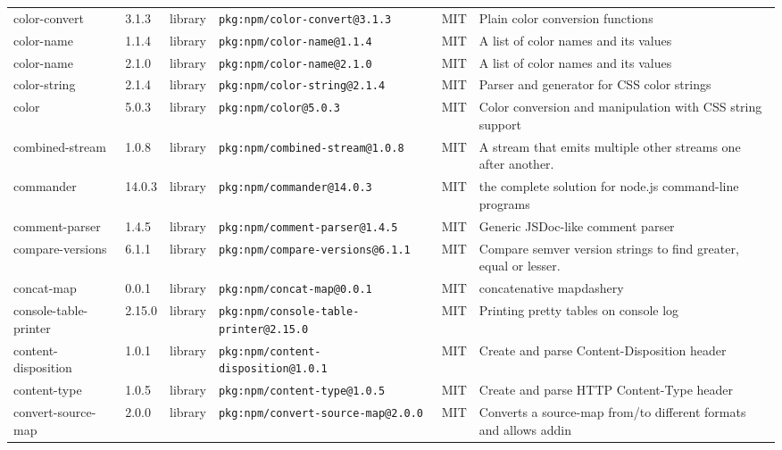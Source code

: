 \documentclass[11pt,a4paper]{article}
\begin{document}
\begin{longtable}{|p{4cm}|p{2cm}|p{1.6cm}|p{5cm}|p{1.5cm}|p{3.5cm}|}
\raggedright color-convert & 3.1.3 & library & \small\texttt{pkg:npm/color-convert@3.1.3} & MIT & \small Plain color conversion functions \\
\raggedright color-name & 1.1.4 & library & \small\texttt{pkg:npm/color-name@1.1.4} & MIT & \small A list of color names and its values \\
\raggedright color-name & 2.1.0 & library & \small\texttt{pkg:npm/color-name@2.1.0} & MIT & \small A list of color names and its values \\
\raggedright color-string & 2.1.4 & library & \small\texttt{pkg:npm/color-string@2.1.4} & MIT & \small Parser and generator for CSS color strings \\
\raggedright color & 5.0.3 & library & \small\texttt{pkg:npm/color@5.0.3} & MIT & \small Color conversion and manipulation with CSS string support \\
\raggedright combined-stream & 1.0.8 & library & \small\texttt{pkg:npm/combined-stream@1.0.8} & MIT & \small A stream that emits multiple other streams one after another. \\
\raggedright commander & 14.0.3 & library & \small\texttt{pkg:npm/commander@14.0.3} & MIT & \small the complete solution for node.js command-line programs \\
\raggedright comment-parser & 1.4.5 & library & \small\texttt{pkg:npm/comment-parser@1.4.5} & MIT & \small Generic JSDoc-like comment parser \\
\raggedright compare-versions & 6.1.1 & library & \small\texttt{pkg:npm/compare-versions@6.1.1} & MIT & \small Compare semver version strings to find greater, equal or lesser. \\
\raggedright concat-map & 0.0.1 & library & \small\texttt{pkg:npm/concat-map@0.0.1} & MIT & \small concatenative mapdashery \\
\raggedright console-table-printer & 2.15.0 & library & \small\texttt{pkg:npm/console-table-printer@2.15.0} & MIT & \small Printing pretty tables on console log \\
\raggedright content-disposition & 1.0.1 & library & \small\texttt{pkg:npm/content-disposition@1.0.1} & MIT & \small Create and parse Content-Disposition header \\
\raggedright content-type & 1.0.5 & library & \small\texttt{pkg:npm/content-type@1.0.5} & MIT & \small Create and parse HTTP Content-Type header \\
\raggedright convert-source-map & 2.0.0 & library & \small\texttt{pkg:npm/convert-source-map@2.0.0} & MIT & \small Converts a source-map from/to  different formats and allows addin \\

\end{longtable}
\end{document}
